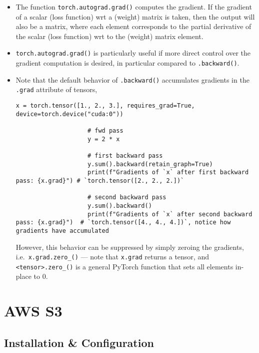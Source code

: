 \documentclass[12pt, a4paper]{article}
\numberwithin{equation}{section}
\theoremstyle{definition}
\theoremstyle{definition}
\begin{document}
			\begin{itemize}
				\item The function \texttt{torch.autograd.grad()} computes the gradient. If the gradient of a scalar (loss function) wrt a (weight) matrix is taken, then the output will also be a matrix, where each element corresponds to the partial derivative of the scalar (loss function) wrt to the (weight) matrix element.
				
				\item \texttt{torch.autograd.grad()} is particularly useful if more direct control over the gradient computation is desired, in particular compared to \texttt{.backward()}.
				
				\item Note that the default behavior of \texttt{.backward()} accumulates gradients in the \texttt{.grad} attribute of tensors,
				
				\begin{lstlisting}[style=mystylepython, label=alg:torch_backward, xleftmargin=\parindent]
					x = torch.tensor([1., 2., 3.], requires_grad=True, device=torch.device("cuda:0"))
					
					# fwd pass
					y = 2 * x
					
					# first backward pass
					y.sum().backward(retain_graph=True)
					print(f"Gradients of `x` after first backward pass: {x.grad}") # `torch.tensor([2., 2., 2.])`
					
					# second backward pass
					y.sum().backward()
					print(f"Gradients of `x` after second backward pass: {x.grad}")  # `torch.tensor([4., 4., 4.])`, notice how gradients have accumulated
				\end{lstlisting}
				
				However, this behavior can be suppressed by simply zeroing the gradients, i.e.~\texttt{x.grad.zero\_()} --- note that \texttt{x.grad} returns a tensor, and \texttt{<tensor>.zero\_()} is a general PyTorch function that sets all elements in-place to $0$.
			\end{itemize}

	\newpage 
	
	\section{AWS S3} 
	
	\subsection{Installation \& Configuration}
	
\end{document}
